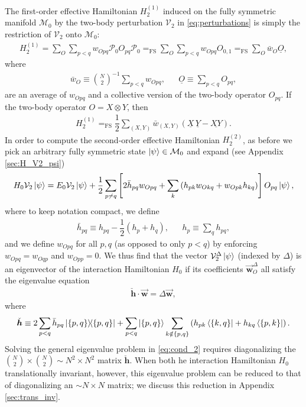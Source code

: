 \documentclass[nofootinbib,notitlepage,11pt]{revtex4-2}
\newcommand{\f}[2]{\dfrac{#1}{#2}} %
\newcommand{\p}[1]{\left(#1\right)} %
\renewcommand{\sp}[1]{\left[#1\right]} %
\renewcommand{\set}[1]{\left\{#1\right\}} %
\renewcommand{\c}{\cdot} %
\newcommand{\m}{\bm} %
\renewcommand{\v}{\vec} %
\newcommand{\1}{\mathds{1}}
\newcommand{\M}{\mathcal{M}}
\renewcommand{\P}{\mathcal{P}}
\newcommand{\V}{\mathcal{V}}
\newcommand{\EQFS}{=_{\text{FS}}}
\newcommand{\col}{\underline}
\begin{document}
The first-order effective Hamiltonian $H_2^{(1)}$ induced on the fully
symmetric manifold $\M_0$ by the two-body perturbation $\V_2$ in
\eqref{eq:perturbations} is simply the restriction of $\V_2$ onto
$\M_0$:
\begin{align}
  H_2^{(1)} = \sum_O \sum_{p<q} w_{Opq} \P_0 O_{pq} \P_0
  \EQFS \sum_O \sum_{p<q} w_{Opq} O_{0,1}
  \EQFS \sum_O \bar w_O \col{O},
\end{align}
where
\begin{align}
  \bar w_O \equiv {N \choose 2}^{-1} \sum_{p<q} w_{Opq},
  &&
  \col{O} \equiv \sum_{p<q} O_{pq},
\end{align}
are an average of $w_{Opq}$ and a collective version of the two-body
operator $O_{pq}$.  If the two-body operator $O=X\otimes Y$, then
\begin{align}
  H_2^{(1)} \EQFS \f12 \sum_{\p{X,Y}} \bar w_{\p{X,Y}}
  \p{\col{X}\,\col{Y} - \col{XY}}.
\end{align}
In order to compute the second-order effective Hamiltonian
$H_2^{(2)}$, as before we pick an arbitrary fully symmetric state
$\ket\psi\in\M_0$ and expand (see Appendix \ref{sec:H_V2_psi})
\begin{align}
  H_0 \V_2 \ket\psi
  = E_0 \V_2 \ket\psi
  + \f12 \sum_{p\ne q} \sp{2\bar h_{pq} w_{Opq}
    + \sum_k \p{h_{pk} w_{Okq} + w_{Opk} h_{kq}}}
  O_{pq} \ket\psi,
  \label{eq:H_V2_psi}
\end{align}
where to keep notation compact, we define
\begin{align}
  \bar h_{pq} \equiv h_{pq} - \f12\p{h_p + h_q},
  &&
  h_p \equiv \sum_q h_{pq},
\end{align}
and we define $w_{Opq}$ for all $p,q$ (as opposed to only $p<q$) by
enforcing $w_{Opq}=w_{Oqp}$ and $w_{Opp}=0$.  We thus find that the
vector $\V_2^\Delta\ket\psi$ (indexed by $\Delta$) is an eigenvector
of the interaction Hamiltonian $H_0$ if its coefficients
$\v{\m w}_O^\Delta$ all satisfy the eigenvalue equation
\begin{align}
  \check{\m h} \c \v{\m w} = \Delta \v{\m w},
  \label{eq:cond_2}
\end{align}
where
\begin{align}
  \check{\m h} \equiv 2\sum_{p<q} \bar h_{pq} \op{\set{p,q}}
  + \sum_{p<q} \ket{\set{p,q}} \sum_{k\notin\set{p,q}}
  \p{h_{pk} \bra{\set{k,q}} + h_{kq} \bra{\set{p,k}}}.
  \label{eq:h_super_mat}
\end{align}
Solving the general eigenvalue problem in \eqref{eq:cond_2} requires
diagonalizing the ${N \choose 2}\times{N \choose 2}\sim N^2\times N^2$
matrix $\check{\m h}$.  When both he interaction Hamiltonian $H_0$
translationally invariant, however, this eigenvalue problem can be
reduced to that of diagonalizing an $\sim N\times N$ matrix; we
discuss this reduction in Appendix \ref{sec:trans_inv}.
\end{document}
